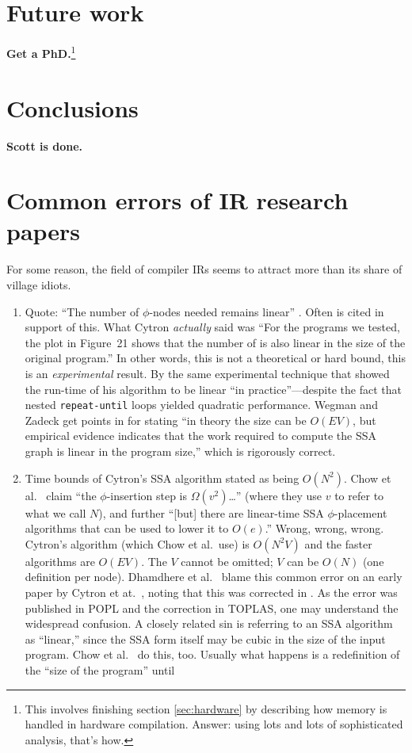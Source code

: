 \documentclass[12pt,titlepage]{article}
\newcommand{\mysection}[1]{\section{#1}\setcounter{figure}{0}}
\begin{document}
\mysection{Future work}
\textbf{Get a PhD.}\footnote{This involves finishing section
\ref{sec:hardware} by describing how memory is handled in hardware
compilation.  Answer: using lots and lots of sophisticated analysis,
that's how.}

\mysection{Conclusions}
\textbf{Scott is done.}

\newpage

\newpage
\appendix
\mysection{Common errors of IR research papers}
For some reason, the field of compiler IRs seems to attract more than
its share of village idiots.
\begin{enumerate}
\item Quote: ``The number of $\phi$-nodes needed remains linear''
\cite{sreedhar95:lintime}.  Often \cite{cytron91:ssa} is cited in
support of this.  What Cytron \emph{actually} said was ``For the
programs we tested, the plot in Figure~21 shows that the number of
 is also linear in the size of the original program.''
In other words, this is not a theoretical or hard bound, this is an
\emph{experimental} result.  By the same experimental technique that
showed the run-time of his algorithm to be linear ``in
practice''---despite the fact that nested \texttt{repeat-until} loops
yielded quadratic performance.  Wegman and Zadeck get points in
\cite{wegman91:scc} for stating ``in theory the size can be $O(EV)$,
but empirical evidence indicates that the work required to compute the
SSA graph is linear in the program size,'' which is rigorously correct.
\item Time bounds of Cytron's SSA algorithm stated as being $O(N^2)$.
Chow et al.\ \cite{chow97:ssapre} claim ``the $\phi$-insertion step is
$\Omega(v^2)$\ldots'' (where they use $v$ to refer to what we call
$N$), and further ``[but] there are linear-time SSA $\phi$-placement
algorithms that can be used to lower it to $O(e)$.''  Wrong, wrong,
wrong.  Cytron's algorithm (which Chow et al.\ use) is $O(N^2 V)$ and
the faster algorithms are $O(EV)$.  The $V$ cannot be omitted; $V$ can
be $O(N)$ (one definition per node).  Dhamdhere et al.\
\cite{dhamdhere92:large} blame this common error on an early paper by
Cytron et at.\ \cite{cytron89:ssa}, noting that this was corrected in
\cite{cytron91:ssa}.  As the error was published in POPL and the
correction in TOPLAS, one may understand the widespread confusion.  A
closely related sin is referring to an SSA algorithm as ``linear,''
since the SSA form itself may be cubic in the size of the input
program.  Chow et al.\ \cite{chow97:ssapre} do this, too.  Usually
what happens is a redefinition of the ``size of the program'' until

\end{enumerate}
\end{document}
